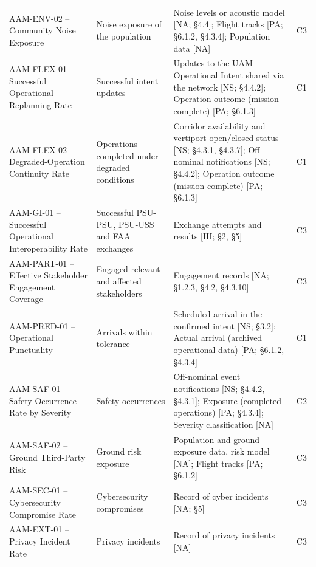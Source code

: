 \begin{table}[!t]
\begin{tabularx}{\textwidth}{@{}>{\raggedright\arraybackslash}p{}>{\raggedright\arraybackslash}p{}>{\raggedright\arraybackslash}X>{\centering\arraybackslash}p{}@{}}
AAM-ENV-02 -- Community Noise Exposure & Noise exposure of the population & Noise levels or acoustic model [NA; \S{}4.4]; Flight tracks [PA; \S{}6.1.2, \S{}4.3.4]; Population data [NA] & C3 \\
AAM-FLEX-01 -- Successful Operational Replanning Rate & Successful intent updates & Updates to the UAM Operational Intent shared via the network [NS; \S{}4.4.2]; Operation outcome (mission complete) [PA; \S{}6.1.3] & C1 \\
AAM-FLEX-02 -- Degraded-Operation Continuity Rate & Operations completed under degraded conditions & Corridor availability and vertiport open/closed status [NS; \S{}4.3.1, \S{}4.3.7]; Off-nominal notifications [NS; \S{}4.4.2]; Operation outcome (mission complete) [PA; \S{}6.1.3] & C1 \\
AAM-GI-01 -- Successful Operational Interoperability Rate & Successful PSU-PSU, PSU-USS and FAA exchanges & Exchange attempts and results [IH; \S{}2, \S{}5] & C3 \\
AAM-PART-01 -- Effective Stakeholder Engagement Coverage & Engaged relevant and affected stakeholders & Engagement records [NA; \S{}1.2.3, \S{}4.2, \S{}4.3.10] & C3 \\
AAM-PRED-01 -- Operational Punctuality & Arrivals within tolerance & Scheduled arrival in the confirmed intent [NS; \S{}3.2]; Actual arrival (archived operational data) [PA; \S{}6.1.2, \S{}4.3.4] & C1 \\
AAM-SAF-01 -- Safety Occurrence Rate by Severity & Safety occurrences & Off-nominal event notifications [NS; \S{}4.4.2, \S{}4.3.1]; Exposure (completed operations) [PA; \S{}4.3.4]; Severity classification [NA] & C2 \\
AAM-SAF-02 -- Ground Third-Party Risk & Ground risk exposure & Population and ground exposure data, risk model [NA]; Flight tracks [PA; \S{}6.1.2] & C3 \\
AAM-SEC-01 -- Cybersecurity Compromise Rate & Cybersecurity compromises & Record of cyber incidents [NA; \S{}5] & C3 \\
AAM-EXT-01 -- Privacy Incident Rate & Privacy incidents & Record of privacy incidents [NA] & C3 \\
\bottomrule
\end{tabularx}
\end{table}
